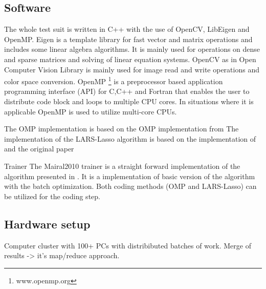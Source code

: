 \subsection*{Software}
The whole test suit is written in C++ with the use of OpenCV, LibEigen and OpenMP.
Eigen \cite{Eigen} is a template library for fast vector and matrix operations and includes some linear algebra algorithms.
It is mainly used for operations on dense and sparse matrices and solving of linear equation systems.
OpenCV \cite{OpenCV} as in Open Computer Vision Library is mainly used for image read and write operations and color space conversion.
OpenMP \footnote{www.openmp.org} \cite{OpenMP} is a preprocessor based application programming interface (API) for C,C++ and Fortran that enables 
the user to distribute code block and loops to multiple CPU cores. 
In situations where it is applicable OpenMP is used to utilize multi-core CPUs. 

The OMP implementation is based on the OMP implementation from \cite{Rubinstein}
The implementation of the LARS-Lasso algorithm is based on the implementation of \cite{Strand2005} and the original paper \cite{Efron2004}

Trainer
The Mairal2010 trainer is a straight forward implementation of the algorithm presented in \cite{Mairal2010}.
It is a implementation of basic version of the algorithm with the batch optimization. 
Both coding methods (OMP and LARS-Lasso) can be utilized for the coding step.


\subsection*{Hardware setup}
Computer cluster with 100+ PCs with distribibuted batches of work.
Merge of results -> it's  map/reduce approach.


